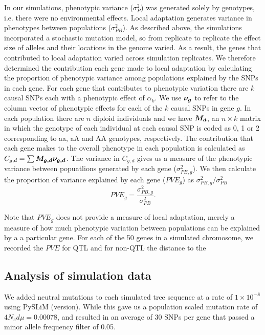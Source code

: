 \documentclass[11pt,twoside,lineno]{GSA_format}
\newcommand{\bm}[1]{\mbox{\boldmath{$#1$}}}
\begin{document}
In our simulations, phenotypic variance ($\sigma^{2}_{P}$) was generated solely by genotypes, i.e. there were no environmental effects. Local adaptation generates variance in phenotypes between populations ($\sigma^{2}_{PB}$). 
As described above, the simulations incorporated a stochastic mutation model, so from replicate to replicate the effect size of alleles and their locations in the genome varied. As a result, the genes that contributed to local adaptation varied across simulation replicates. We therefore determined the contribution  each gene made to local adaptation by calculating the proportion of phenotypic variance among populations explained by the SNPs in each gene. For each gene that contributes to phenotypic variation there are $k$ causal SNPs each with a phenotypic effect of $\alpha_k$. We use $\bm{\nu_g}$ to refer to the column vector of phenotypic effects for each of the $k$ causal SNPs in gene $g$. In each population there are $n$ diploid individuals and we have $\bm{M_d}$, an $n \times k$ matrix in which the genotype of each individual at each causal SNP is coded as 0, 1 or 2 corresponding to aa, aA and AA genotypes, respectively. The contribution that each gene makes to the overall phenotype in each population is calculated as $C_{g,d} = \sum \bm{M_{g,d} \nu_{g,d}}$. The variance in $C_{g,d}$ gives us a measure of the phenotypic variance between popuatlions generated by each gene ($\sigma^{2}_{PB,g}$). We then calculate the proportion of variance explained by each gene ($PVE_g$) as $\sigma^{2}_{PB,g} / \sigma^{2}_{PB}$
\begin{equation}
PVE_g = \frac{\sigma^{2}_{PB,g}}{\sigma^{2}_{PB}}.
\end{equation}

Note that $PVE_g$ does not provide a measure of local adaptation, merely a measure of how much phenotypic variation between populations can be explained by a a particular gene. 
For each of the 50 genes in a simulated chromosome, we recorded the $PVE$ for QTL and for non-QTL the distance to the 

\subsection{Analysis of simulation data}

We added neutral mutations to each simulated tree sequence at a rate of $1\times10^{-8}$ using PySLiM (version). While this gave us a population scaled mutation rate of $4N_ed\mu = 0.00078$, and resulted in an average of 30 SNPs per gene that passed a minor allele frequency filter of 0.05.
\end{document}
